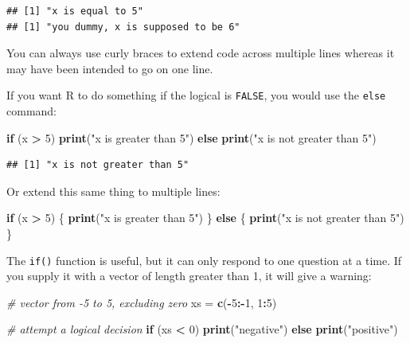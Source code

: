 \documentclass[]{book}
\newenvironment{Shaded}{\begin{snugshade}}{\end{snugshade}}
\newcommand{\KeywordTok}[1]{\textcolor[rgb]{0.13,0.29,0.53}{\textbf{#1}}}
\newcommand{\DecValTok}[1]{\textcolor[rgb]{0.00,0.00,0.81}{#1}}
\newcommand{\StringTok}[1]{\textcolor[rgb]{0.31,0.60,0.02}{#1}}
\newcommand{\CommentTok}[1]{\textcolor[rgb]{0.56,0.35,0.01}{\textit{#1}}}
\newcommand{\ControlFlowTok}[1]{\textcolor[rgb]{0.13,0.29,0.53}{\textbf{#1}}}
\newcommand{\OperatorTok}[1]{\textcolor[rgb]{0.81,0.36,0.00}{\textbf{#1}}}
\newcommand{\NormalTok}[1]{#1}
\theoremstyle{definition}
\theoremstyle{definition}
\theoremstyle{definition}
\theoremstyle{remark}
\begin{document}
\begin{verbatim}
## [1] "x is equal to 5"
## [1] "you dummy, x is supposed to be 6"
\end{verbatim}

You can always use curly braces to extend code across multiple lines
whereas it may have been intended to go on one line.

If you want R to do something if the logical is \texttt{FALSE}, you
would use the \texttt{else} command:

\begin{Shaded}
\begin{Highlighting}[]
\ControlFlowTok{if}\NormalTok{ (x }\OperatorTok{>}\StringTok{ }\DecValTok{5}\NormalTok{) }\KeywordTok{print}\NormalTok{(}\StringTok{"x is greater than 5"}\NormalTok{) }\ControlFlowTok{else} \KeywordTok{print}\NormalTok{(}\StringTok{"x is not greater than 5"}\NormalTok{)}
\end{Highlighting}
\end{Shaded}

\begin{verbatim}
## [1] "x is not greater than 5"
\end{verbatim}

Or extend this same thing to multiple lines:

\begin{Shaded}
\begin{Highlighting}[]
\ControlFlowTok{if}\NormalTok{ (x }\OperatorTok{>}\StringTok{ }\DecValTok{5}\NormalTok{) \{}
  \KeywordTok{print}\NormalTok{(}\StringTok{"x is greater than 5"}\NormalTok{)}
\NormalTok{\} }\ControlFlowTok{else}\NormalTok{ \{}
  \KeywordTok{print}\NormalTok{(}\StringTok{"x is not greater than 5"}\NormalTok{)}
\NormalTok{\} }
\end{Highlighting}
\end{Shaded}

The \texttt{if()} function is useful, but it can only respond to one
question at a time. If you supply it with a vector of length greater
than 1, it will give a warning:

\begin{Shaded}
\begin{Highlighting}[]
\CommentTok{# vector from -5 to 5, excluding zero}
\NormalTok{xs =}\StringTok{ }\KeywordTok{c}\NormalTok{(}\OperatorTok{-}\DecValTok{5}\OperatorTok{:-}\DecValTok{1}\NormalTok{, }\DecValTok{1}\OperatorTok{:}\DecValTok{5}\NormalTok{)}

\CommentTok{# attempt a logical decision}
\ControlFlowTok{if}\NormalTok{ (xs }\OperatorTok{<}\StringTok{ }\DecValTok{0}\NormalTok{) }\KeywordTok{print}\NormalTok{(}\StringTok{"negative"}\NormalTok{) }\ControlFlowTok{else} \KeywordTok{print}\NormalTok{(}\StringTok{"positive"}\NormalTok{)}
\end{Highlighting}
\end{Shaded}
\end{document}
